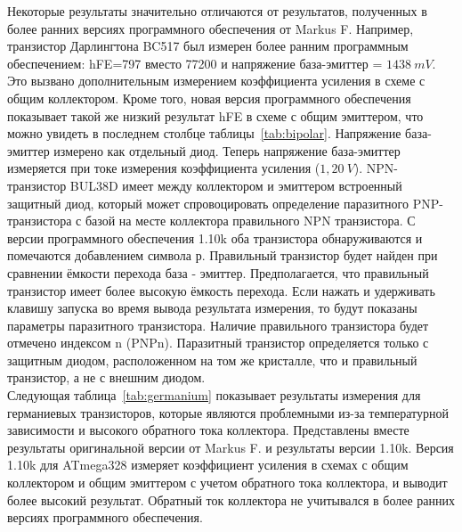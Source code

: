 Некоторые результаты значительно отличаются от результатов, полученных в более ранних версиях программного 
обеспечения от Markus F. Например, транзистор Дарлингтона BC517 был измерен более ранним программным 
обеспечением: hFE=797 вместо 77200 и напряжение база-эмиттер = \(1438~mV\). Это вызвано дополнительным измерением 
коэффициента усиления в схеме с общим коллектором. Кроме того, новая версия программного обеспечения показывает 
такой же низкий результат hFE в схеме с общим эмиттером, что можно увидеть в последнем столбце 
таблицы~\ref{tab:bipolar}.
Напряжение база-эмиттер измерено как отдельный диод. Теперь напряжение база-эмиттер измеряется при токе измерения 
коэффициента усиления (\(1,20~V\)). NPN-транзистор BUL38D имеет между коллектором и эмиттером встроенный защитный диод, 
который может спровоцировать определение паразитного PNP-транзистора с базой на месте коллектора правильного 
NPN транзистора. С версии программного обеспечения 1.10k оба транзистора обнаруживаются и помечаются добавлением 
символа р. Правильный транзистор будет найден при сравнении ёмкости перехода база - эмиттер. Предполагается, 
что правильный транзистор имеет более высокую ёмкость перехода. Если нажать и удерживать клавишу запуска во время 
вывода результата измерения, то будут показаны параметры паразитного транзистора. Наличие правильного транзистора 
будет отмечено индексом n (PNPn). Паразитный транзистор определяется только с защитным диодом, расположенном на 
том же кристалле, что и правильный транзистор, а не с внешним диодом.\\

Следующая таблица~\ref{tab:germanium} показывает результаты измерения для германиевых транзисторов, которые являются 
проблемными из-за температурной зависимости и высокого обратного тока коллектора. Представлены вместе результаты 
оригинальной версии от Markus F. и результаты версии 1.10k. Версия 1.10k для ATmega328 измеряет коэффициент усиления 
в схемах с общим коллектором и общим эмиттером с учетом обратного тока коллектора, и выводит более высокий результат. 
Обратный ток коллектора не учитывался в более ранних версиях программного обеспечения.

